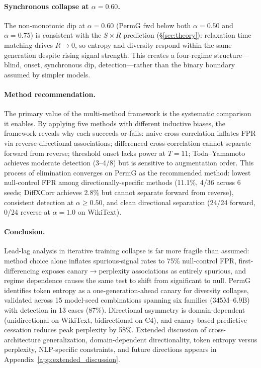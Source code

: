 \paragraph{Synchronous collapse at $\alpha{=}0.60$.}
The non-monotonic dip at $\alpha{=}0.60$ (PermG fwd below both $\alpha{=}0.50$ and $\alpha{=}0.75$) is consistent with the $S \times R$ prediction (\S\ref{sec:theory}): relaxation time matching drives $R \to 0$, so entropy and diversity respond within the same generation despite rising signal strength.
This creates a four-regime structure---blind, onset, synchronous dip, detection---rather than the binary boundary assumed by simpler models.

\paragraph{Method recommendation.}
The primary value of the multi-method framework is the systematic comparison it enables.
By applying five methods with different inductive biases, the framework reveals why each succeeds or fails: naive cross-correlation inflates FPR via reverse-directional associations; differenced cross-correlation cannot separate forward from reverse; threshold onset lacks power at $T{=}11$; Toda--Yamamoto achieves moderate detection (3--4/8) but is sensitive to augmentation order.
This process of elimination converges on PermG as the recommended method: lowest null-control FPR among directionally-specific methods (11.1\%, 4/36 across 6 seeds; DiffXCorr achieves 2.8\% but cannot separate forward from reverse), consistent detection at $\alpha{\geq}0.50$, and clean directional separation (24/24 forward, 0/24 reverse at $\alpha{=}1.0$ on WikiText).

\paragraph{Conclusion.}
Lead-lag analysis in iterative training collapse is far more fragile than assumed: method choice alone inflates spurious-signal rates to 75\% null-control FPR, first-differencing exposes canary$\to$perplexity associations as entirely spurious, and regime dependence causes the same test to shift from significant to null.
PermG identifies token entropy as a one-generation-ahead canary for diversity collapse, validated across 15 model-seed combinations spanning six families (345M--6.9B) with detection in 13 cases (87\%).
Directional asymmetry is domain-dependent (unidirectional on WikiText, bidirectional on C4), and canary-based predictive cessation reduces peak perplexity by 58\%.
Extended discussion of cross-architecture generalization, domain-dependent directionality, token entropy versus perplexity, NLP-specific constraints, and future directions appears in Appendix~\ref{app:extended_discussion}.
